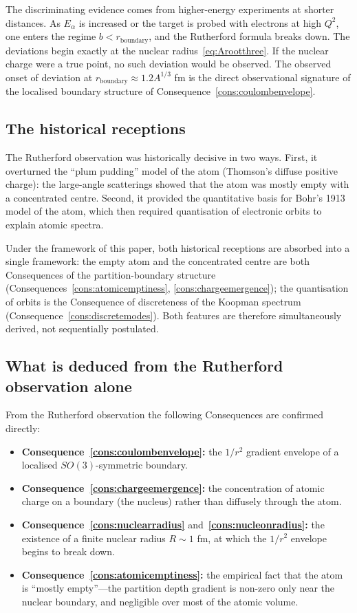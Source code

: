 \documentclass[11pt,twocolumn,a4paper]{article}
\theoremstyle{axiomstyle}
\theoremstyle{conseqstyle}
\theoremstyle{definition}
\theoremstyle{remark}
\begin{document}
The discriminating evidence comes from higher-energy experiments at shorter distances. As $E_{\alpha}$ is increased or the target is probed with electrons at high $Q^{2}$, one enters the regime $b<r_{\text{boundary}}$, and the Rutherford formula breaks down. The deviations begin exactly at the nuclear radius~\eqref{eq:Arootthree}. If the nuclear charge were a true point, no such deviation would be observed. The observed onset of deviation at $r_{\text{boundary}}\approx 1.2 A^{1/3}$ fm is the direct observational signature of the localised boundary structure of Consequence~\ref{cons:coulombenvelope}.

\subsection{The historical receptions}

The Rutherford observation was historically decisive in two ways. First, it overturned the ``plum pudding'' model of the atom (Thomson's diffuse positive charge): the large-angle scatterings showed that the atom was mostly empty with a concentrated centre. Second, it provided the quantitative basis for Bohr's 1913 model of the atom, which then required quantisation of electronic orbits to explain atomic spectra.

Under the framework of this paper, both historical receptions are absorbed into a single framework: the empty atom and the concentrated centre are both Consequences of the partition-boundary structure (Consequences~\ref{cons:atomicemptiness}, \ref{cons:chargeemergence}); the quantisation of orbits is the Consequence of discreteness of the Koopman spectrum (Consequence~\ref{cons:discretemodes}). Both features are therefore simultaneously derived, not sequentially postulated.

\subsection{What is deduced from the Rutherford observation alone}

From the Rutherford observation the following Consequences are confirmed directly:
\begin{itemize}
\item \textbf{Consequence~\ref{cons:coulombenvelope}:} the $1/r^{2}$ gradient envelope of a localised $SO(3)$-symmetric boundary.
\item \textbf{Consequence~\ref{cons:chargeemergence}:} the concentration of atomic charge on a boundary (the nucleus) rather than diffusely through the atom.
\item \textbf{Consequence~\ref{cons:nuclearradius}} and~\textbf{\ref{cons:nucleonradius}:} the existence of a finite nuclear radius $R\sim 1$ fm, at which the $1/r^{2}$ envelope begins to break down.
\item \textbf{Consequence~\ref{cons:atomicemptiness}:} the empirical fact that the atom is ``mostly empty''---the partition depth gradient is non-zero only near the nuclear boundary, and negligible over most of the atomic volume.
\end{itemize}
\end{document}
